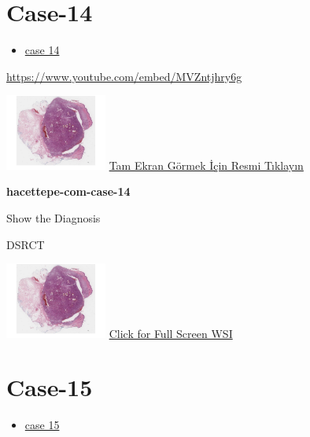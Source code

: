 \documentclass[
  letterpaper,
  paper=6in:9in,
  pagesize=pdftex,
  headinclude=on,
  footinclude=on,
  12pt]{scrbook}
\providecommand{\tightlist}{%
  \setlength{\itemsep}{0pt}\setlength{\parskip}{0pt}}\usepackage{longtable,booktabs,array}
\begin{document}
\hypertarget{sec-hacettepe-case-of-the-month-case-14}{%
\section{Case-14}\label{sec-hacettepe-case-of-the-month-case-14}}

\begin{itemize}
\tightlist
\item
  \href{https://www.youtube.com/watch?v=MVZntjhry6g\&ab_channel=KemalKosemehmetoglu}{case
  14}
\end{itemize}

\url{https://www.youtube.com/embed/MVZntjhry6g}

\href{https://images.patolojiatlasi.com/hacettepe-com-case-1/HE.html}{\includegraphics[width=0.25\textwidth,height=\textheight]{./screenshots/hacettepe-com-case-1_screenshot.png}}
\href{https://images.patolojiatlasi.com/hacettepe-com-case-14/HE.html}{Tam
Ekran Görmek İçin Resmi Tıklayın}

\textbf{hacettepe-com-case-14}

Show the Diagnosis

\hypertarget{answer14}{}
DSRCT

\href{https://images.patolojiatlasi.com/hacettepe-com-case-1/HE.html}{\includegraphics[width=0.25\textwidth,height=\textheight]{./screenshots/hacettepe-com-case-1_screenshot.png}}
\href{https://images.patolojiatlasi.com/hacettepe-com-case-14/HE.html}{Click
for Full Screen WSI}

\hypertarget{sec-hacettepe-case-of-the-month-case-15}{%
\section{Case-15}\label{sec-hacettepe-case-of-the-month-case-15}}

\begin{itemize}
\tightlist
\item
  \href{https://www.youtube.com/watch?v=3lmx9hYGcG8\&ab_channel=KemalKosemehmetoglu}{case
  15}
\end{itemize}
\end{document}

